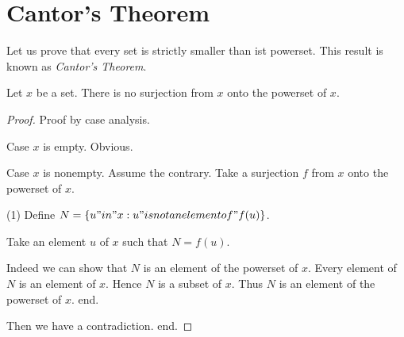 \documentclass{article}
\begin{document}

  \section*{Cantor's Theorem}

  Let us prove that every set is strictly smaller than ist powerset. This result
  is known as \textit{Cantor's Theorem}.

  \begin{forthel}

    \begin{theorem}[Cantor]
      Let $x$ be a set. There is no surjection from $x$ onto the powerset of $x$.
    \end{theorem}

    \begin{proof}
      Proof by case analysis.

      Case $x$ is empty. Obvious.

      Case $x$ is nonempty.
        Assume the contrary. Take a surjection $f$ from $x$ onto the powerset of $x$.

        (1) Define $N = \{ u "in" x : u "is not an element of" f(u) \}$.

        Take an element $u$ of $x$ such that $N = f(u)$.

        Indeed we can show that $N$ is an element of the powerset of $x$.
          Every element of $N$ is an element of $x$. Hence $N$ is a subset of $x$. Thus $N$ is an element of the powerset of $x$.
        end.

        Then we have a contradiction.
      end.
    \end{proof}
  \end{forthel}
\end{document}
